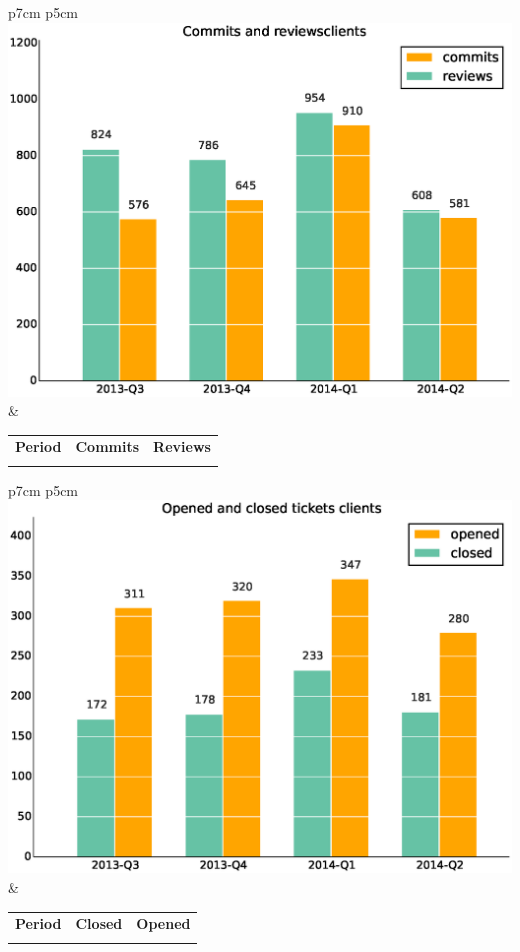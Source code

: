 \documentclass[a4wide,11pt]{report}
\begin{document}
\begin{tabular}{p{7cm} p{5cm}}
    \vspace{0pt} 
    \includegraphics[scale=.35]{figs/commitsclients.eps}
    & 
    \vspace{0pt}
    \begin{tabular}{l|r|r|}%
    \bfseries Period & \bfseries Commits & \bfseries Reviews %
    \csvreader[head to column names]{data/commitsclients.csv}{}%
    {\\ & \commits & \submitted}
    \end{tabular}
\end{tabular}

\begin{tabular}{p{7cm} p{5cm}}
    \vspace{0pt} 
    \includegraphics[scale=.35]{figs/closedclients.eps}
    & 
    \vspace{0pt}
    \begin{tabular}{l|r|r|}%
\bfseries Period & \bfseries Closed & \bfseries Opened
    \csvreader[head to column names]{data/closedclients.csv}{}%
    {\\ & \closed & \opened}
    \end{tabular}
\end{tabular}
\end{document}
